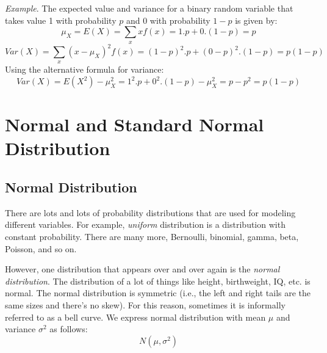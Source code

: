\documentclass{./../../Latex/handout}
\begin{document}
\textit{Example}. The expected value and variance for a binary random variable that takes value 1 with probability $p$ and 0 with probability $1-p$ is given by:
$$ \mu_X = E(X) =  \sum_{x} xf(x) = 1.p + 0.(1-p) = p$$
$$ Var(X) =  \sum_{x} (x-\mu_X)^2 f(x) = (1-p)^2.p + (0-p)^2.(1-p) = p(1-p)$$
Using the alternative formula for variance:
$$ Var(X) = E(X^2)-\mu_X^2 = 1^2.p +0^2.(1-p) -\mu_X^2 = p-p^2 = p(1-p)$$

\section{Normal and Standard Normal Distribution} 

\subsection{Normal Distribution}
There are lots and lots of probability distributions that are used for modeling different variables. For example, \textit{uniform} distribution is a distribution with constant probability. There are many more, Bernoulli, binomial, gamma, beta, Poisson, and so on. 

 However, one distribution that appears over and over again is the \textit{normal distribution}. The distribution of a lot of things like height, birthweight, IQ, etc. is normal. The normal distribution is symmetric (i.e., the left and right tails are the same sizes and there’s no skew). For this reason, sometimes it is informally referred to as a bell curve. We express normal distribution with mean $\mu$ and variance $\sigma^2$ as follows:
 $$ N(\mu, \sigma^2) $$
  
\end{document}
